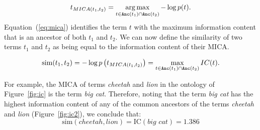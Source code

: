 \documentclass{article}
\newcommand{\argmax}{\operatornamewithlimits{arg\,max}}
\begin{document}
\begin{equation} 
t_{MICA(t_1,t_2)} = \argmax_{t\in \mathtt{Anc}(t_1) \cap 
  \mathtt{Anc}(t_2)}-\log p(t). 
\label{eq:mica} 
\end{equation} 
Equation~(\ref{eq:mica}) identifies the term $t$ with the maximum 
information content that is an ancestor 
of both $t_1$ and $t_2$. We 
can now define the similarity of two terms $t_1$ and $t_2$ as being 
equal to the information content of their MICA. 
 
\begin{equation} 
	\textnormal{sim}(t_1,t_2) = -\log p\left( t_{MICA(t_1,t_2)} \right) 
 = \max_{t\in 
	\mathtt{Anc}(t_1) \cap \mathtt{Anc}(t_2)} IC(t). 
\label{eq:mica-resnik} 
\end{equation} 
 
For example, the MICA of terms \textit{cheetah} and \textit{lion} in 
the ontology of Figure~\ref{fig:ic} is the term \textit{big 
  cat}. Therefore, noting that the term \textit{big cat} has the 
highest information content of any of the common ancestors of the 
terms \textit{cheetah} and \textit{lion} (Figure~\ref{fig:ic2}), we 
conclude that: 
\begin{equation*} 
\mathrm{sim}(cheetah, lion) =  \mathrm{IC}(\textit{big 
  cat}) = 1.386  
\end{equation*} 
 
\end{document}
